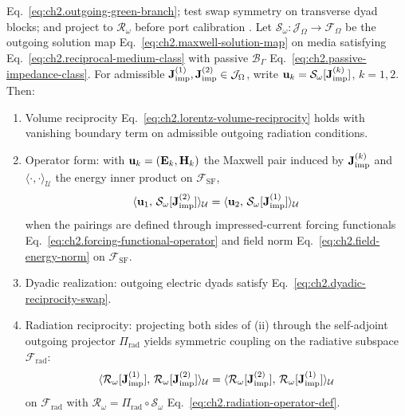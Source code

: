 Eq.~\eqref{eq:ch2.outgoing-green-branch}; test swap symmetry on transverse dyad blocks;
and project to $\mathcal{R}_\omega$ before port calibration \cite{jackson1999}.
\label{thm:ch2.lorentz-reciprocity-operator}
Let \(\mathcal{S}_\omega:\mathcal{J}_\Omega\to\mathcal{F}_\Omega\) be the outgoing solution
map Eq.~\eqref{eq:ch2.maxwell-solution-map} on media satisfying
Eq.~\eqref{eq:ch2.reciprocal-medium-class} with passive \(\mathcal{B}_\Gamma\)
Eq.~\eqref{eq:ch2.passive-impedance-class}. For admissible
\(\mathbf{J}_{\mathrm{imp}}^{(1)},\mathbf{J}_{\mathrm{imp}}^{(2)}\in\mathcal{J}_\Omega\), write
\(\mathbf{u}_k=\mathcal{S}_\omega[\mathbf{J}_{\mathrm{imp}}^{(k)}]\), \(k=1,2\). Then:
\begin{enumerate}
\item[(i)] Volume reciprocity Eq.~\eqref{eq:ch2.lorentz-volume-reciprocity} holds with
vanishing boundary term on admissible outgoing radiation conditions.
\item[(ii)] Operator form: with \(\mathbf{u}_k=(\mathbf{E}_k,\mathbf{H}_k)\) the Maxwell pair induced by
\(\mathbf{J}_{\mathrm{imp}}^{(k)}\) and \(\langle\cdot,\cdot\rangle_{\mathcal{U}}\) the energy inner product on
\(\mathcal{F}_{\mathrm{SF}}\),
\begin{equation}
\label{eq:ch2.lorentz-reciprocity-operator}
\langle \mathbf{u}_1,\,\mathcal{S}_\omega[\mathbf{J}_{\mathrm{imp}}^{(2)}]\rangle_{\mathcal{U}}
=
\langle \mathbf{u}_2,\,\mathcal{S}_\omega[\mathbf{J}_{\mathrm{imp}}^{(1)}]\rangle_{\mathcal{U}}
\end{equation}
when the pairings are defined through impressed-current forcing functionals
Eq.~\eqref{eq:ch2.forcing-functional-operator} and field norm
Eq.~\eqref{eq:ch2.field-energy-norm} on \(\mathcal{F}_{\mathrm{SF}}\).
\item[(iii)] Dyadic realization: outgoing electric dyads satisfy
Eq.~\eqref{eq:ch2.dyadic-reciprocity-swap}.
\item[(iv)] Radiation reciprocity: projecting both sides of (ii) through the self-adjoint
outgoing projector \(\Pi_{\mathrm{rad}}\) yields symmetric coupling on the radiative subspace
\(\mathcal{F}_{\mathrm{rad}}\):
\begin{equation}
\label{eq:ch2.radiation-map-reciprocity}
\langle \mathcal{R}_\omega[\mathbf{J}_{\mathrm{imp}}^{(1)}],\,\mathcal{R}_\omega[\mathbf{J}_{\mathrm{imp}}^{(2)}]\rangle_{\mathcal{U}}
=
\langle \mathcal{R}_\omega[\mathbf{J}_{\mathrm{imp}}^{(2)}],\,\mathcal{R}_\omega[\mathbf{J}_{\mathrm{imp}}^{(1)}]\rangle_{\mathcal{U}}
\end{equation}
on \(\mathcal{F}_{\mathrm{rad}}\) with \(\mathcal{R}_\omega=\Pi_{\mathrm{rad}}\circ\mathcal{S}_\omega\)
Eq.~\eqref{eq:ch2.radiation-operator-def}.
\end{enumerate}
